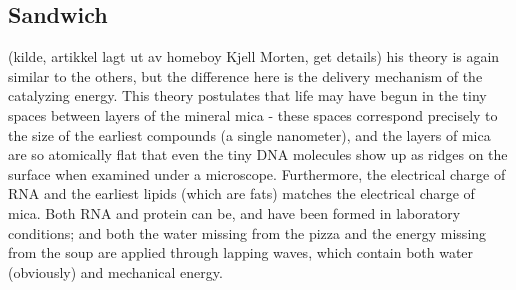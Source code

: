\subsection{Sandwich} (kilde, artikkel lagt ut av homeboy Kjell Morten, get details)
his theory is again similar to the others, but the difference here is the delivery mechanism of the catalyzing energy\cite{szosa}. This theory postulates that life may have begun in the tiny spaces between layers of the mineral mica - these spaces correspond precisely to the size of the earliest compounds (a single nanometer), and the layers of mica are so atomically flat that even the tiny DNA molecules show up as ridges on the surface when examined under a microscope. Furthermore, the electrical charge of RNA and the earliest lipids (which are fats) matches the electrical charge of mica. Both RNA and protein can be, and have been formed in laboratory conditions; and both the water missing from the pizza and the energy missing from the soup are applied through lapping waves, which contain both water (obviously) and mechanical energy. 
